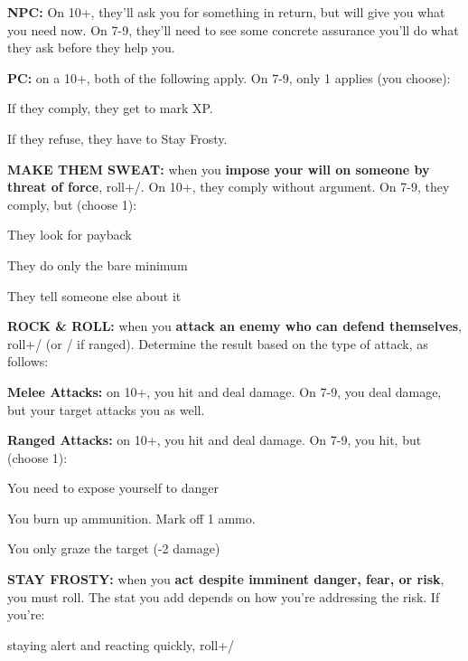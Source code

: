 \documentclass[oneside,10pt]{article}
\begin{document}
\begin{multicols}{2}
\begin{dent}
\textbf{NPC:} On 10+, they’ll ask you for something in return,
but will give you what you need now. On 7-9, they’ll
need to see some concrete assurance you’ll do what
they ask before they help you.

\textbf{PC:} on a 10+, both of the following apply. On 7-9, only
1 applies (you choose):
\begin{dent}
\tcirc{} If they comply, they get to mark XP.

\tcirc{} If they refuse, they have to Stay Frosty.
\end{dent}
\end{dent}

\label{move_makethemsweat}
\textbf{MAKE THEM SWEAT:} when you \textbf{impose your will on someone
  by threat of force}, roll+\oomph/. On 10+, they comply without
argument. On 7-9, they comply, but (choose 1):
\begin{dent}

\tcirc{} They look for payback

\tcirc{} They do only the bare minimum

\tcirc{} They tell someone else about it
\end{dent}

\label{move_rockandroll}
\textbf{ROCK \& ROLL:} when you \textbf{attack an enemy who can defend
  themselves}, roll+\oomph/ (or \mastery/ if ranged). Determine the
result based on the type of attack, as follows:
\begin{dent}

\textbf{Melee Attacks:} on 10+, you hit and deal damage. On 7-9,
you deal damage, but your target attacks you as
well.

\textbf{Ranged Attacks:} on 10+, you hit and deal damage. On
7-9, you hit, but (choose 1):
\begin{dent}

\tcirc{} You need to expose yourself to danger

\tcirc{} You burn up ammunition. Mark off 1 ammo.

\tcirc{} You only graze the target (-2 damage)
\end{dent}
\end{dent}

\label{move_stayfrosty}
\textbf{STAY FROSTY:} when you \textbf{act despite imminent danger,
fear, or risk}, you must roll. The stat you add depends on
how you’re addressing the risk. If you’re:
\begin{dent}

\tcirc{} staying alert and reacting quickly,
roll+\twitch/


\end{dent}
\end{multicols}
\end{document}
